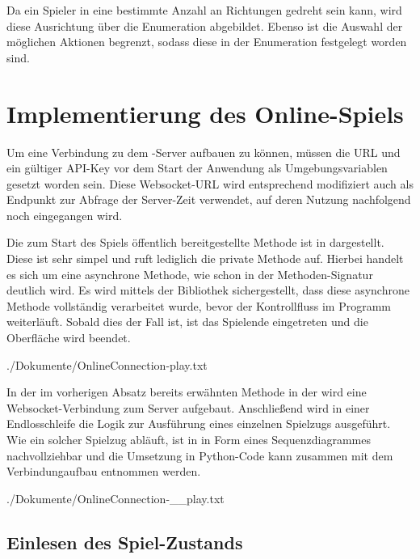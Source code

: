 Da ein Spieler in eine bestimmte Anzahl an Richtungen gedreht sein kann, wird diese Ausrichtung über die Enumeration
 abgebildet.
Ebenso ist die Auswahl der möglichen Aktionen begrenzt, sodass diese in der Enumeration  festgelegt
worden sind.

\section{Implementierung des Online-Spiels}
\label{sec:online-implementierung}

Um eine Verbindung zu dem -Server aufbauen zu können, müssen die URL und ein gültiger API-Key vor dem
Start der Anwendung als Umgebungsvariablen gesetzt worden sein.
Diese Websocket-URL wird entsprechend modifiziert auch als Endpunkt zur Abfrage der Server-Zeit verwendet, auf deren
Nutzung nachfolgend noch eingegangen wird.

Die zum Start des Spiels öffentlich bereitgestellte Methode  ist in  dargestellt.
Diese ist sehr simpel und ruft lediglich die private Methode  auf.
Hierbei handelt es sich um eine asynchrone Methode, wie schon in der Methoden-Signatur deutlich wird.
Es wird mittels der Bibliothek  sichergestellt, dass diese asynchrone Methode vollständig verarbeitet
wurde, bevor der Kontrollfluss im Programm weiterläuft.
Sobald dies der Fall ist, ist das Spielende eingetreten und die Oberfläche wird beendet.


{./Dokumente/OnlineConnection-play.txt}

In der im vorherigen Absatz bereits erwähnten Methode  in der  wird eine
Websocket-Verbindung zum Server aufgebaut.
Anschließend wird in einer Endlosschleife die Logik zur Ausführung eines einzelnen Spielzugs ausgeführt.
Wie ein solcher Spielzug abläuft, ist in  in Form eines Sequenzdiagrammes
nachvollziehbar und die Umsetzung in Python-Code kann zusammen mit dem Verbindungaufbau 
entnommen werden.


{./Dokumente/OnlineConnection-__play.txt}

\subsection{Einlesen des Spiel-Zustands}
\label{subsec:einlesen-spielzustand}

